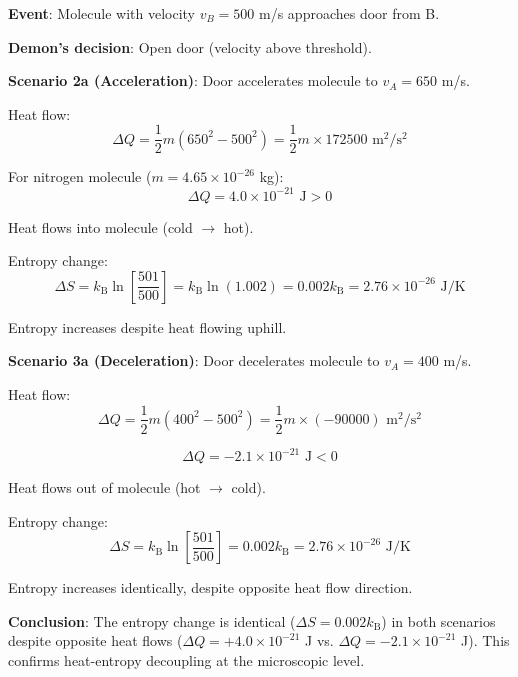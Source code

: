\documentclass[10pt,twocolumn,letterpaper]{article}
\theoremstyle{definition}
\theoremstyle{remark}
\newcommand{\kb}{k_\text{B}}
\begin{document}
\textbf{Event}: Molecule with velocity $v_B = 500$ m/s approaches door from B.

\textbf{Demon's decision}: Open door (velocity above threshold).

\textbf{Scenario 2a (Acceleration)}: Door accelerates molecule to $v_A = 650$ m/s.

Heat flow:
\begin{equation}
\Delta Q = \frac{1}{2}m(650^2 - 500^2) = \frac{1}{2}m \times 172500 \text{ m}^2/\text{s}^2
\end{equation}

For nitrogen molecule ($m = 4.65 \times 10^{-26}$ kg):
\begin{equation}
\Delta Q = 4.0 \times 10^{-21} \text{ J} > 0
\end{equation}

Heat flows into molecule (cold $\to$ hot).

Entropy change:
\begin{equation}
\Delta S = \kb \ln\left[\frac{501}{500}\right] = \kb \ln(1.002) = 0.002 \kb = 2.76 \times 10^{-26} \text{ J/K}
\end{equation}

Entropy increases despite heat flowing uphill.

\textbf{Scenario 3a (Deceleration)}: Door decelerates molecule to $v_A = 400$ m/s.

Heat flow:
\begin{equation}
\Delta Q = \frac{1}{2}m(400^2 - 500^2) = \frac{1}{2}m \times (-90000) \text{ m}^2/\text{s}^2
\end{equation}

\begin{equation}
\Delta Q = -2.1 \times 10^{-21} \text{ J} < 0
\end{equation}

Heat flows out of molecule (hot $\to$ cold).

Entropy change:
\begin{equation}
\Delta S = \kb \ln\left[\frac{501}{500}\right] = 0.002 \kb = 2.76 \times 10^{-26} \text{ J/K}
\end{equation}

Entropy increases identically, despite opposite heat flow direction.

\textbf{Conclusion}: The entropy change is identical ($\Delta S = 0.002 \kb$) in both scenarios despite opposite heat flows ($\Delta Q = +4.0 \times 10^{-21}$ J vs. $\Delta Q = -2.1 \times 10^{-21}$ J). This confirms heat-entropy decoupling at the microscopic level.
\end{document}
